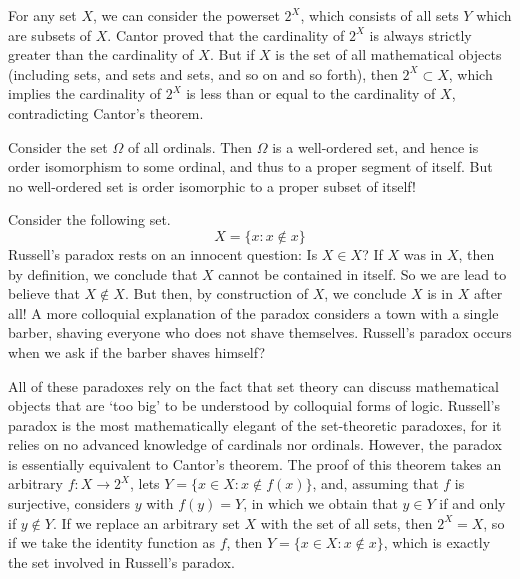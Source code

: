 \begin{example}
    For any set $X$, we can consider the powerset $2^X$, which consists of all sets $Y$ which are subsets of $X$. Cantor proved that the cardinality of $2^X$ is always strictly greater than the cardinality of $X$. But if $X$ is the set of all mathematical objects (including sets, and sets and sets, and so on and so forth), then $2^X \subset X$, which implies the cardinality of $2^X$ is less than or equal to the cardinality of $X$, contradicting Cantor's theorem.
\end{example}

\begin{example}
    Consider the set $\Omega$ of all ordinals. Then $\Omega$ is a well-ordered set, and hence is order isomorphism to some ordinal, and thus to a proper segment of itself. But no well-ordered set is order isomorphic to a proper subset of itself!
\end{example}

\begin{example}
    Consider the following set.
    \[ X = \{ x: x \not \in x \} \]
    Russell's paradox rests on an innocent question: Is $X \in X$? If $X$ was in $X$, then by definition, we conclude that $X$ cannot be contained in itself. So we are lead to believe that $X \not \in X$. But then, by construction of $X$, we conclude $X$ is in $X$ after all! A more colloquial explanation of the paradox considers a town with a single barber, shaving everyone who does not shave themselves. Russell's paradox occurs when we ask if the barber shaves himself?
\end{example}

All of these paradoxes rely on the fact that set theory can discuss mathematical objects that are `too big' to be understood by colloquial forms of logic. Russell's paradox is the most mathematically elegant of the set-theoretic paradoxes, for it relies on no advanced knowledge of cardinals nor ordinals. However, the paradox is essentially equivalent to Cantor's theorem. The proof of this theorem takes an arbitrary $f: X \to 2^X$, lets $Y = \{ x \in X: x \not \in f(x) \}$, and, assuming that $f$ is surjective, considers $y$ with $f(y) = Y$, in which we obtain that $y \in Y$ if and only if $y \not \in Y$. If we replace an arbitrary set $X$ with the set of all sets, then $2^X = X$, so if we take the identity function as $f$, then $Y = \{ x \in X : x \not \in x \}$, which is exactly the set involved in Russell's paradox.

